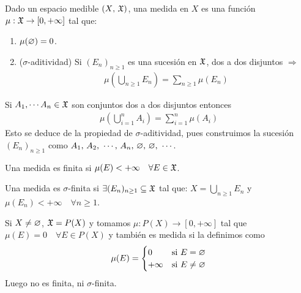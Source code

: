 \begin{definition}[Medida]
    Dado un espacio medible \((X\text{, } \mathfrak{X})\), una medida en \(X\) es una función \(\mu : \mathfrak{X} \to [0, +\infty]\) tal que:
    \begin{enumerate}
        \item \(\mu(\varnothing) = 0\).
        \item (\(\sigma\)-aditividad) Si \((E_n)_{n \geq 1}\) es una sucesión en \(\mathfrak{X}\), dos a dos disjuntos \(\Rightarrow\) \begin{align*}
                  \mu(\bigcup_{n \geq 1} E_n) = \sum_{n \geq 1} \mu(E_n)
              \end{align*}
    \end{enumerate}
\end{definition}

\begin{note}
    Si \(A_1, \cdots A_n \in \mathfrak{X}\) son conjuntos dos a dos disjuntos entonces \begin{align*}
        \mu(\bigcup_{i = 1}^n A_i) = \sum_{i = 1}^n \mu(A_i)
    \end{align*}
    Esto se deduce de la propiedad de \(\sigma\)-aditividad, pues construimos la sucesión \((E_n)_{n \geq 1}\) como \(A_1\text{, } A_2\text{, } \cdots\text{, } A_n\text{, } \varnothing\text{, } \varnothing\text{, } \cdots\).
\end{note}

\begin{definition}
    Una medida es finita si \(\mu(E) < +\infty \quad \forall E \in \mathfrak{X}\).
\end{definition}

\begin{definition}
    Una medida es \(\sigma\)-finita si \(\exists (E_n)_{n \geq 1} \subseteq \mathfrak{X}\) tal que: \(X = \bigcup_{n \geq 1} E_n\) y \(\mu(E_n) < +\infty \quad \forall n \geq 1\).
\end{definition}

\begin{eg}
    Si \(X \neq \varnothing\), \(\mathfrak{X} = P(X)\) y tomamos \(\mu : P(X) \to [0, +\infty]\) tal que \(\mu(E) = 0 \quad \forall E \in P(X)\) y también es medida si la definimos como \begin{align*}
        \mu(E) = \begin{cases}
                     0       & \text{si } E = \varnothing    \\
                     +\infty & \text{si } E \neq \varnothing
                 \end{cases}
    \end{align*}
    Luego no es finita, ni \(\sigma\)-finita.
\end{eg}

